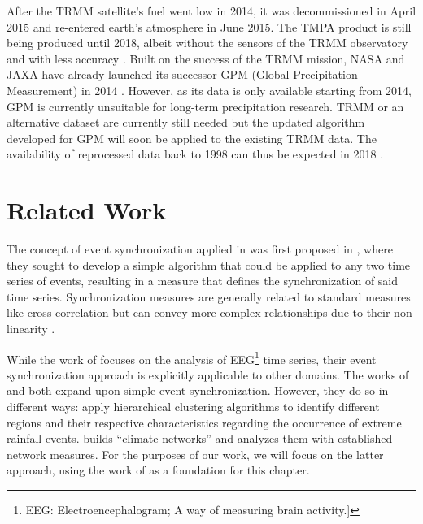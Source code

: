 After the TRMM satellite's fuel went low in 2014, it was decommissioned in April 2015 and re-entered earth's atmosphere in June 2015. The TMPA product is still being produced until 2018, albeit without the sensors of the TRMM observatory and with less accuracy \citep{Huffman.2017}. Built on the success of the TRMM mission, NASA and JAXA have already launched its successor GPM (Global Precipitation Measurement) in 2014 \citep{GoddardEarthScienceDataInformationandServicesCenter.2011}. However, as its data is only available starting from 2014, GPM is currently unsuitable for long-term precipitation research. TRMM or an alternative dataset are currently still needed but the updated algorithm developed for GPM will soon be applied to the existing TRMM data. The availability of reprocessed data back to 1998 can thus be expected in 2018 \citep{Huffman.2016}.


\clearpage
\section{Related Work}
The concept of event synchronization applied in \citet{Stolbova.2015} was first proposed in \citet{QuianQuiroga.2002}, where they sought to develop a simple algorithm that could be applied to any two time series of events, resulting in a measure that defines the synchronization of said time series. Synchronization measures are generally related to standard measures like cross correlation but can convey more complex relationships due to their non-linearity \citep{QuianQuiroga.2002}.

While the work of \citet{QuianQuiroga.2002} focuses on the analysis of EEG\footnote{EEG: Electroencephalogram; A way of measuring brain activity.]} time series, their event synchronization approach is explicitly applicable to other domains. The works of \citet{Malik.2010} and \citet{Stolbova.2015} both expand upon simple event synchronization. However, they do so in different ways: \citet{Malik.2010} apply hierarchical clustering algorithms to identify different regions and their respective characteristics regarding the occurrence of extreme rainfall events. \citet{Stolbova.2015} builds ``climate networks'' and analyzes them with established network measures. For the purposes of our work, we will focus on the latter approach, using the work of \citet{Stolbova.2015} as a foundation for this chapter.

